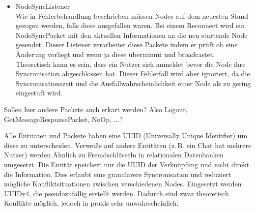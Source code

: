 \begin{itemize}
        \item NodeSyncListener\\
            Wie in Fehlerbehandlung beschrieben müssen Nodes auf dem neuesten Stand gezogen werden, falls diese ausgefallen waren. Bei einem Reconnect wird ein NodeSyncPacket mit den aktuellen Informationen an die neu startende Node gesendet. Dieser Listener verarbeitet diese Packete indem er prüft ob eine Änderung vorliegt und wenn ja diese übernimmt und broadcastet. Theoretisch kann es sein, dass ein Nutzer sich anmeldet bevor die Node ihre Syncronisation abgeschlossen hat. Dieser Fehlerfall wird aber ignoriert, da die Syncronisationszeit und die Ausfallwahrscheinlichkeit einer Node als zu gering eingestuft wird.
    \end{itemize}


    Sollen hier andere Packete auch erkärt werden? Also Logout, GetMessageResponsePacket, NoOp, ...?



Alle Entitäten und Packete haben eine UUID (Universally Unique Identifier) um diese zu unterscheiden. Verweiße auf andere Entitäten (z.\,B. ein Chat hat mehrere Nutzer) werden Ähnlich zu Fremdschlüsseln in relationalen Datenbanken umgesetzt. Die Entität speichert nur die UUID der Verknüpfung und nicht direkt die Information. Dies erlaubt eine granularere Syncronisation und reduziert mögliche Konfliktsituationen zwischen verschiedenen Nodes. Eingesetzt werden UUIDv4, die pseudozufällig erstellt werden. Dadurch sind zwar theoretisch Konflikte möglich, jedoch in praxis sehr unwahrscheinlich.

